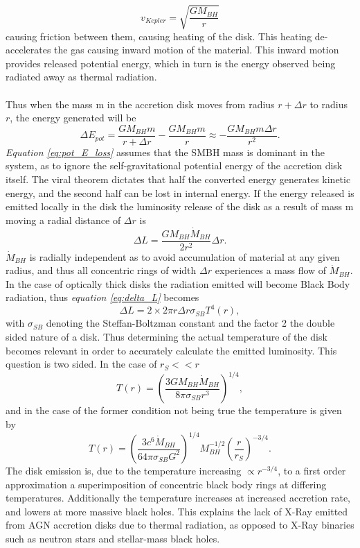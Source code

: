 \documentclass[a4paper, 12pt, twoside]{article}
\begin{document}
\begin{equation}
v_{Kepler} = \sqrt{\frac{GM_{BH}}{r}}
\label{eq:Kepler_velocity}
\end{equation}
causing friction between them, causing heating of the disk. This heating de-accelerates the gas causing inward motion of the material. This inward motion provides released potential energy, which in turn is the energy observed being radiated away as thermal radiation. \\
\\
Thus when the mass m in the accretion disk moves from radius $r+\Delta r$ to radius $r$, the energy generated will be
\begin{equation}
\Delta E_{pot} = \frac{GM_{BH}m}{r+\Delta r} - \frac{GM_{BH}m}{r} \approx -\frac{GM_{BH}m\Delta r}{r^{2}}.
\label{eq:pot_E_loss}
\end{equation}
\emph{Equation \ref{eq:pot_E_loss}} assumes that the SMBH mass is dominant in the system, as to ignore the self-gravitational potential energy of the accretion disk itself. The viral theorem dictates that half the converted energy generates kinetic energy, and the second half can be lost in internal energy. If the energy released is emitted locally in the disk the luminosity release of the disk as a result of mass m moving a radial distance of $\Delta r$ is
\begin{equation}
\Delta L = \frac{GM_{BH}\dot{M}_{BH}}{2r^{2}}\Delta r.
\label{eq:delta_L}
\end{equation}
$\dot{M}_{BH}$ is radially independent as to avoid accumulation of material at any given radius, and thus all concentric rings of width $\Delta r$ experiences a mass flow of $\dot{M}_{BH}$. In the case of optically thick disks the radiation emitted will become Black Body radiation, thus \emph{equation \ref{eq:delta_L}} becomes
\begin{equation}
\Delta L = 2\times 2\pi r\Delta r\sigma_{SB}T^{4}(r),
\label{eq:delta_L_BB}
\end{equation}
with $\sigma_{SB}$ denoting the Steffan-Boltzman constant and the factor 2 the double sided nature of a disk. Thus determining the actual temperature of the disk becomes relevant in order to accurately calculate the emitted luminosity. This question is two sided. In the case of $r_{S}<<r$
\begin{equation}
T(r) = (\frac{3GM_{BH}\dot{M}_{BH}}{8\pi\sigma_{SB}r^{3}})^{1/4},
\label{eq:T_r_s_less_r}
\end{equation}
and in the case of the former condition not being true the temperature is given by
\begin{equation}
T(r) = (\frac{3c^{6}\dot{M}_{BH}}{64\pi\sigma_{SB}G^{2}})^{1/4}M_{BH}^{-1/2}(\frac{r}{r_{S}})^{-3/4}.
\label{eq:T_r}
\end{equation}
The disk emission is, due to the temperature increasing $\propto r^{-3/4}$, to a first order approximation a superimposition of concentric black body rings at differing temperatures. Additionally the temperature increases at increased accretion rate, and lowers at more massive black holes. This explains the lack of X-Ray emitted from AGN accretion disks due to thermal radiation, as opposed to X-Ray binaries such as neutron stars and stellar-mass black holes. 	
\end{document}
